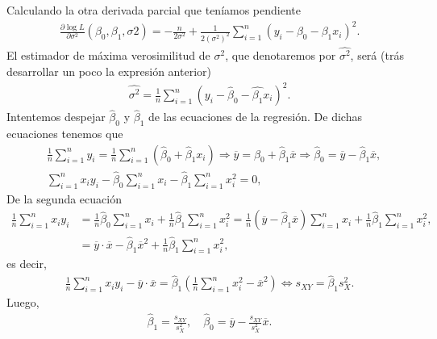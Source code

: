 Calculando la otra derivada parcial que teníamos pendiente
\begin{align*}
    \frac{\partial \log L}{\partial \sigma^2}(\beta_0, \beta_1,\sigma2) = - \frac{n}{2\sigma^2} + \frac{1}{2(\sigma^2)^2} \sum_{i=1}^{n} (y_i - \beta_0 - \beta_1 x_i)^2.
\end{align*}
El estimador de máxima verosimilitud de $\sigma^2$, que denotaremos por $\widehat{\sigma^2}$, será (trás desarrollar un poco la expresión anterior)
\begin{align*}
    \boxed{
        \widehat{\sigma^2} = \frac{1}{n} \sum_{i=1}^{n} (y_i - \widehat{\beta}_0 - \widehat{\beta_1} x_i)^2.
    }
\end{align*}
Intentemos despejar $\widehat{\beta}_0$ y $\widehat{\beta}_1$ de las ecuaciones de la regresión. De dichas ecuaciones tenemos que
\begin{align*}
     & \frac{1}{n} \sum_{i=1}^{n} y_i = \frac{1}{n} \sum_{i=1}^{n}(\widehat{\beta}_0 + \widehat{\beta}_1x_i) \Longrightarrow \overline{y} = \widehat{\beta}_0 + \widehat{\beta}_1 \overline{x} \Longrightarrow \widehat{\beta}_0 = \overline{y} - \widehat{\beta}_1 \overline{x}, \\
     & \sum_{i=1}^{n} x_iy_i - \widehat{\beta}_0 \sum_{i=1}^{n} x_i - \widehat{\beta}_1 \sum_{i=1}^{n} x_i^2 = 0,
\end{align*}
De la segunda ecuación
\begin{align*}
    \frac{1}{n}\sum_{i=1}^{n} x_iy_i & = \frac{1}{n}\widehat{\beta}_0 \sum_{i=1}^{n} x_i + \frac{1}{n} \widehat{\beta}_1 \sum_{i=1}^{n} x_i^2
    = \frac{1}{n}(\overline{y} - \widehat{\beta}_1\overline{x}) \sum_{i=1}^{n} x_i + \frac{1}{n}\widehat{\beta}_1 \sum_{i=1}^{n} x_i^2,                           \\
                                     & = \overline{y} \cdot \overline{x} - \widehat{\beta}_1 \overline{x}^2 + \frac{1}{n} \widehat{\beta}_1 \sum_{i=1}^{n} x_i^2,
\end{align*}
es decir,
\begin{align*}
    \frac{1}{n}\sum_{i=1}^{n} x_iy_i - \overline{y} \cdot \overline{x} = \widehat{\beta}_1 \left( \frac{1}{n} \sum_{i=1}^{n} x_i^2 - \overline{x}^2 \right) \Longleftrightarrow s_{XY} = \widehat{\beta}_1 s_X^2.
\end{align*}
Luego,
\begin{align*}
    \boxed{
        \widehat{\beta}_1 = \frac{s_{XY}}{s_X^2}, \quad \widehat{\beta}_0 = \overline{y} - \frac{s_{XY}}{s_X^2}\overline{x}.
    }
\end{align*}

